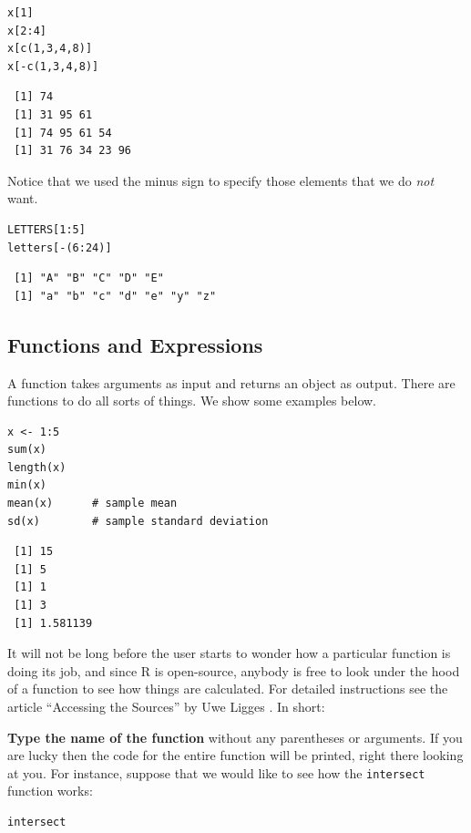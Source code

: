 \documentclass[captions=tableheading]{scrbook}
\begin{document}
\begin{verbatim}
x[1]
x[2:4]
x[c(1,3,4,8)]
x[-c(1,3,4,8)]
\end{verbatim}

\begin{verbatim}
 [1] 74
 [1] 31 95 61
 [1] 74 95 61 54
 [1] 31 76 34 23 96
\end{verbatim}

Notice that we used the minus sign to specify those elements that we do \emph{not} want. 


\begin{verbatim}
LETTERS[1:5]
letters[-(6:24)]
\end{verbatim}

\begin{verbatim}
 [1] "A" "B" "C" "D" "E"
 [1] "a" "b" "c" "d" "e" "y" "z"
\end{verbatim}
\subsection{Functions and Expressions}
\label{sec-2-3-4}

\label{sub:Functions-and-Expressions}

A function takes arguments as input and returns an object as output. There are functions to do all sorts of things. We show some examples below.


\begin{verbatim}
x <- 1:5
sum(x)
length(x)
min(x)
mean(x)      # sample mean
sd(x)        # sample standard deviation
\end{verbatim}

\begin{verbatim}
 [1] 15
 [1] 5
 [1] 1
 [1] 3
 [1] 1.581139
\end{verbatim}

It will not be long before the user starts to wonder how a particular function is doing its job, and since \textsf{R} is open-source, anybody is free to look under the hood of a function to see how things are calculated. For detailed instructions see the article ``Accessing the Sources'' by Uwe Ligges \cite{Ligges2006}. In short:

\textbf{Type the name of the function} without any parentheses or arguments. If you are lucky then the code for the entire function will be printed, right there looking at you. For instance, suppose that we would like to see how the \texttt{intersect} function works:


\begin{verbatim}
intersect
\end{verbatim}
\end{document}
